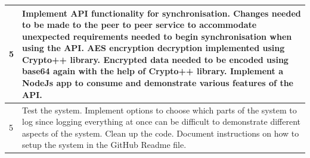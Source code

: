 \begin{enumerate}
\begin{table}[h]
\begin{tabular}{|p{1cm}|p{12cm}|}
\hline 5 & Implement API functionality for synchronisation. Changes needed to be made to the peer to peer service to accommodate unexpected requirements needed to begin synchronisation when using the API. AES encryption decryption implemented using Crypto++ \cite{cryptopp} library. Encrypted data needed to be encoded using base64 again with the help of Crypto++ library. Implement a NodeJs app to consume and demonstrate various features of the API.\\ [12pt]

\hline 5 & Test the system. Implement options to choose which parts of the system to log since logging everything at once can be difficult to demonstrate different aspects of the system. Clean up the code. Document instructions on how to setup the system in the GitHub Readme file. \\ [12pt]

\hline
\end{tabular} \\
\label{tab:sprint_plan}
\end{table}

\FloatBarrier



\end{enumerate}
